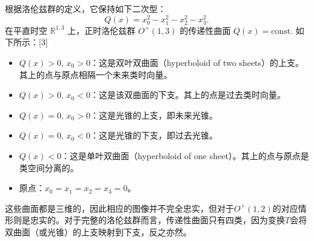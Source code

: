 根据洛伦兹群的定义，它保持如下二次型：
\[
Q(x) = x_{0}^{2} - x_{1}^{2} - x_{2}^{2} - x_{3}^{2}.~
\]
在平直时空 $\mathbb{R}^{1,3}$ 上，正时洛伦兹群 $O^{+}(1,3)$ 的传递性曲面 $Q(x)=\text{const.}$ 如下所示：[3]
\begin{itemize}
  \item $Q(x) > 0,\, x_{0} > 0$：这是双叶双曲面（hyperboloid of two sheets）的上支。其上的点与原点相隔一个未来类时向量。
  \item $Q(x) > 0,\, x_{0} < 0$：这是该双曲面的下支。其上的点是过去类时向量。
  \item $Q(x) = 0,\, x_{0} > 0$：这是光锥的上支，即未来光锥。
  \item $Q(x) = 0,\, x_{0} < 0$：这是光锥的下支，即过去光锥。
  \item $Q(x) < 0$：这是单叶双曲面（hyperboloid of one sheet）。其上的点与原点是类空间分离的。
  \item 原点：$x_{0} = x_{1} = x_{2} = x_{3} = 0$。
\end{itemize}
这些曲面都是三维的，因此相应的图像并不完全忠实，但对于$O^{+}(1,2)$的对应情形则是忠实的。对于完整的洛伦兹群而言，传递性曲面只有四类，因为变换$T$会将双曲面（或光锥）的上支映射到下支，反之亦然。
